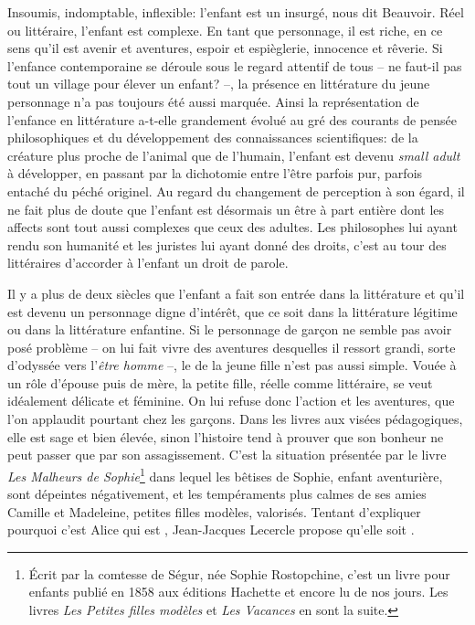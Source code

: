 Insoumis, indomptable, inflexible: l'enfant est un insurgé, nous dit Beauvoir.
Réel ou littéraire, l'enfant est complexe.
En tant que personnage, il est riche, en ce sens qu'il est avenir et aventures, espoir et espièglerie, innocence et rêverie.
Si l'enfance contemporaine se déroule sous le regard attentif de tous -- ne faut-il pas tout un village pour élever un enfant? --, la présence en littérature du jeune personnage n'a pas toujours été aussi marquée.
Ainsi la représentation de l'enfance en littérature a-t-elle grandement évolué au gré des courants de pensée philosophiques et du développement des connaissances scientifiques: de la créature plus proche de l'animal que de l'humain, l'enfant est devenu \textit{small adult} à développer, en passant par la dichotomie entre l'être parfois pur, parfois entaché du péché originel.
Au regard du changement de perception à son égard, il ne fait plus de doute que l'enfant est désormais un être à part entière dont les affects sont tout aussi complexes que ceux des adultes.
Les philosophes lui ayant rendu son humanité et les juristes lui ayant donné des droits, c'est au tour des littéraires d'accorder à l'enfant un droit de parole.
\par
Il y a plus de deux siècles que l'enfant a fait son entrée dans la littérature et qu'il est devenu un personnage digne d'intérêt, que ce soit dans la littérature légitime ou dans la littérature enfantine.
Si le personnage de garçon ne semble pas avoir posé problème -- on lui fait vivre des aventures desquelles il ressort grandi, sorte d'odyssée vers l'\textit{être homme} --, le  de la jeune fille n'est pas aussi simple.
Vouée à un rôle d'épouse puis de mère, la petite fille, réelle comme littéraire, se veut idéalement délicate et féminine.
On lui refuse donc l'action et les aventures, que l'on applaudit pourtant chez les garçons.
Dans les livres aux visées pédagogiques, elle est sage et bien élevée, sinon l'histoire tend à prouver que son bonheur ne peut passer que par son assagissement.
C'est la situation présentée par le livre \textit{Les Malheurs de Sophie}\footnote{Écrit par la comtesse de Ségur, née Sophie Rostopchine, c'est un livre pour enfants publié en 1858 aux éditions Hachette et encore lu de nos jours. Les livres \textit{Les Petites filles modèles} et \textit{Les Vacances} en sont la suite.} dans lequel les bêtises de Sophie, enfant aventurière, sont dépeintes négativement, et les tempéraments plus calmes de ses amies Camille et Madeleine, petites filles modèles, valorisés.
Tentant d'expliquer pourquoi c'est Alice qui est , Jean-Jacques Lecercle propose qu'elle soit .
